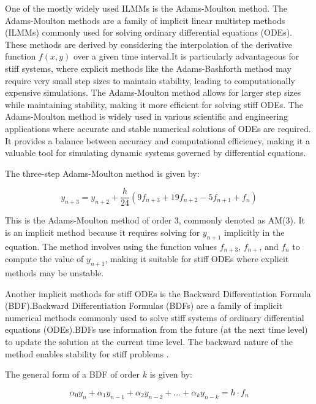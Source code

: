 \documentclass[a4paper, twoside]{report} %
\begin{document}
	One of the mostly widely used ILMMs is the Adams-Moulton method. The Adams-Moulton methods are a family of implicit linear multistep methods (ILMMs) commonly used for solving ordinary differential equations (ODEs). These methods are derived by considering the interpolation of the derivative function $f(x,y)$ over a given time interval.It is particularly advantageous for stiff systems, where explicit methods like the Adams-Bashforth method may require very small step sizes to maintain stability, leading to computationally expensive simulations. The Adams-Moulton method allows for larger step sizes while maintaining stability, making it more efficient for solving stiff ODEs.
	The Adams-Moulton method is widely used in various scientific and engineering applications where accurate and stable numerical solutions of ODEs are required. It provides a balance between accuracy and computational efficiency, making it a valuable tool for simulating dynamic systems governed by differential equations.

	The three-step Adams-Moulton method is given by:


	\begin{equation}
		y_{n+3} = y_{n+2} + \frac{h}{24} \left( 9 f_{n+3} + 19 f_{n+2} - 5 f_{n+1} + f_{n} \right)
	\end{equation}


	This is the Adams-Moulton method of order 3, commonly denoted as AM(3). It is an implicit method because it requires solving for \( y_{n+1} \) implicitly in the equation. The method involves using the function values \( f_{n+3} \), \( f_{n+} \), and \( f_n \) to compute the value of \( y_{n+1} \), making it suitable for stiff ODEs where explicit methods may be unstable.


	Another implicit methods for stiff ODEs is the Backward Differentiation Formula (BDF).Backward Differentiation Formulas (BDFs) are a family of implicit numerical methods commonly used to solve stiff systems of ordinary differential equations (ODEs).BDFs use information from the future (at the next time level) to update the solution at the current time level. The backward nature of the method enables stability for stiff problems \cite{numericalrecipes}.

	The general form of a BDF of order \(k\) is given by:

	\begin{equation}
		\alpha_0 y_n + \alpha_1 y_{n-1} + \alpha_2 y_{n-2} + \ldots + \alpha_k y_{n-k} = h \cdot f_n
	\end{equation}
\end{document}
